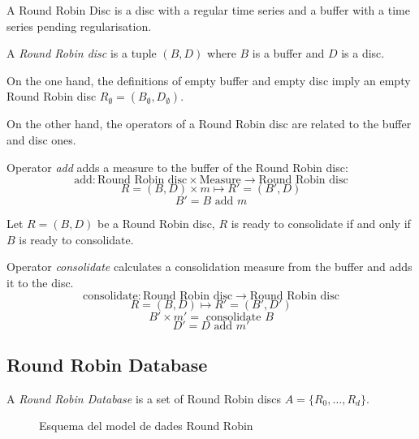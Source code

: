 
A Round Robin Disc is a disc with a regular time series and a buffer
with a time series pending regularisation.

\begin{definition}
  A \emph{Round Robin disc} is a tuple $(B,D)$ where $B$
  is a buffer and $D$ is a disc.
\end{definition}
 
On the one hand, the definitions of empty buffer and empty disc imply
an empty Round Robin disc $R_{\emptyset} = (B_{\emptyset},D_{\emptyset})$.

On the other hand, the operators of a Round Robin disc are related to
the buffer and disc ones.

\begin{definition}
  Operator \emph{add} adds a measure  to the buffer of the Round Robin disc:
  \[
  \text{add}: \text{Round Robin disc} \times \text{Measure}
  \longrightarrow \text{Round Robin disc}
  \]
  \[
  R=(B,D) \times m \mapsto R'= (B',D)
  \]
  \[
  B'= B \text{ add } m
  \]
\end{definition}

\begin{definition}
  Let $R=(B,D)$ be a Round Robin disc, $R$ is ready to consolidate if
  and only if $B$ is ready to consolidate.
\end{definition}

\begin{definition}
  Operator \emph{consolidate} calculates a consolidation measure from
  the buffer and adds it to the disc.
  \[
  \text{consolidate}: \text{Round Robin disc} \longrightarrow
  \text{Round Robin disc}
  \]
  \[
  R=(B,D) \mapsto R'= (B',D')
  \]
  \[
  B' \times m'= \text{ consolidate } B 
  \]
  \[
  D'= D \text{ add } m'
  \]
\end{definition}



\subsection{Round Robin Database}\label{sec:model:rrd}

\begin{definition}
  A \emph{Round Robin Database} is a set of Round Robin discs
  $A=\{R_0,\ldots,R_d\}$.
\end{definition}


\begin{figure}[htp]
\centering
\setlength{\unitlength}{0.4mm}

\caption{Esquema del model de dades Round Robin}%
\label{fig:model:esquemarrd}
\end{figure}
  
